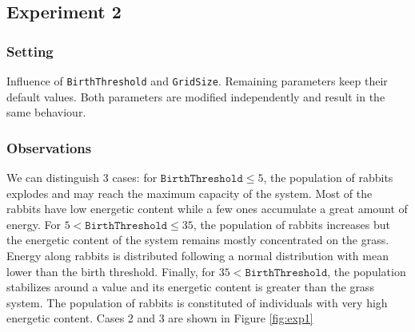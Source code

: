 \documentclass[11pt]{article}
\begin{document}
\subsection{Experiment 2}
\subsubsection{Setting}
Influence of \texttt{BirthThreshold} and \texttt{GridSize}. Remaining parameters keep their default values. Both parameters are modified independently and result in the same behaviour.

\subsubsection{Observations}
We can distinguish 3 cases: for $\texttt{BirthThreshold} \leq 5$, the population of rabbits explodes and may reach the maximum capacity of the system. Most of the rabbits have low energetic content while a few ones accumulate a great amount of energy. For $5 < \texttt{BirthThreshold} \leq 35$, the population of rabbits increases but the energetic content of the system remains mostly concentrated on the grass. Energy along rabbits is distributed following a normal distribution with mean lower than the birth threshold. Finally, for $35 < \texttt{BirthThreshold}$, the population stabilizes around a value and its energetic content is greater than the grass system. The population of rabbits is constituted of individuals with very high energetic content. Cases 2 and 3 are shown in Figure \ref{fig:exp1}
\end{document}

